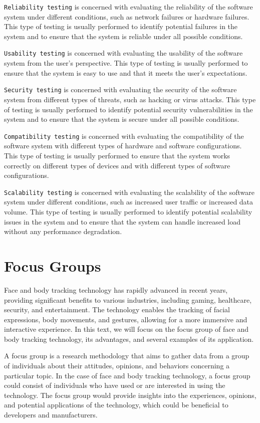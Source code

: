 \texttt{Reliability testing} is concerned with evaluating the reliability of the software system under different conditions, 
such as network failures or hardware failures. This type of testing is usually performed to identify potential failures 
in the system and to ensure that the system is reliable under all possible conditions.

\texttt{Usability testing} is concerned with evaluating the usability of the software system from the user's perspective. This 
type of testing is usually performed to ensure that the system is easy to use and that it meets the user's expectations.

\texttt{Security testing} is concerned with evaluating the security of the software system from different types of threats, such as 
hacking or virus attacks. This type of testing is usually performed to identify potential security vulnerabilities in the 
system and to ensure that the system is secure under all possible conditions.

\texttt{Compatibility testing} is concerned with evaluating the compatibility of the software system with different types of hardware 
and software configurations. This type of testing is usually performed to ensure that the system works correctly on different 
types of devices and with different types of software configurations.

\texttt{Scalability testing} is concerned with evaluating the scalability of the software system under different conditions, such as 
increased user traffic or increased data volume. This type of testing is usually performed to identify potential scalability 
issues in the system and to ensure that the system can handle increased load without any performance degradation.


\section{Focus Groups}
Face and body tracking technology has rapidly advanced in recent years, providing significant benefits to various industries, 
including gaming, healthcare, security, and entertainment. The technology enables the tracking of facial expressions, body movements, 
and gestures, allowing for a more immersive and interactive experience. In this text, we will focus on the focus group of face and body 
tracking technology, its advantages, and several examples of its application.

A focus group is a research methodology that aims to gather data from a group of individuals about their attitudes, opinions, 
and behaviors concerning a particular topic. In the case of face and body tracking technology, a focus group could consist of 
individuals who have used or are interested in using the technology. The focus group would provide insights into the experiences, 
opinions, and potential applications of the technology, which could be beneficial to developers and manufacturers.

